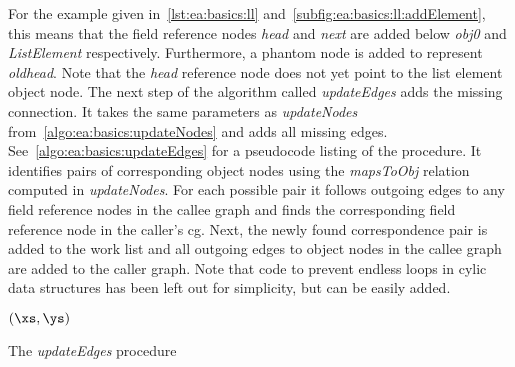 			For the example given in~\cref{lst:ea:basics:ll} and~\cref{subfig:ea:basics:ll:addElement}, this means that the
			field reference nodes \emph{head} and \emph{next} are added below \emph{obj0} and \emph{ListElement} respectively.
			Furthermore, a phantom node is added to represent \emph{oldhead}. Note that the \emph{head} reference node does
			not yet point to the list element object node. The next step of the algorithm called \emph{updateEdges} adds the
			missing connection. It takes the same parameters as \emph{updateNodes} from~\cref{algo:ea:basics:updateNodes} and
			adds all missing edges. See~\cref{algo:ea:basics:updateEdges} for a pseudocode listing of the procedure. It
			identifies pairs of corresponding object nodes using the \emph{mapsToObj} relation computed in \emph{updateNodes}.
			For each possible pair it follows outgoing edges to any field reference nodes in the callee graph and finds the
			corresponding field reference node in the caller's \gls{cg}. Next, the newly found correspondence pair is added to
			the work list and all outgoing edges to object nodes in the callee graph are added to the caller graph. Note that
			code to prevent endless loops in cylic data structures has been left out for simplicity, but can be easily added.

			\begin{algorithm}

				\BlankLine
				\DontPrintSemicolon
				\updateEdges$\left( \xs, \ys \right)$\;
				\PrintSemicolon

				\caption[The \emph{updateEdges} procedure]{The \emph{updateEdges} procedure~\cite[Alg. 3]{lang:12}}
				\label{algo:ea:basics:updateEdges}
			\end{algorithm}

